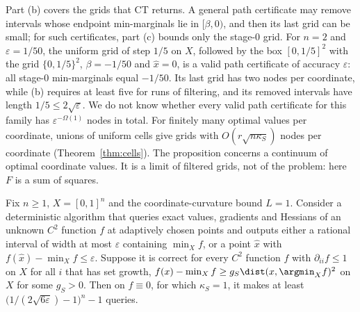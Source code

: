 Part (b) covers the grids that CT returns. A general path certificate may
remove intervals whose endpoint min-marginals lie in $[\beta,0)$, and then
its last grid can be small; for such certificates, part (c) bounds only the
stage-$0$ grid. For
$n=2$ and $\varepsilon=1/50$, the uniform grid of step $1/5$ on $X$, followed by
the box $[0,1/5]^2$ with the grid $\{0,1/5\}^2$, $\beta=-1/50$ and $\hat x=0$,
is a valid path certificate of accuracy $\varepsilon$: all stage-$0$
min-marginals equal $-1/50$. Its last grid has two nodes per coordinate,
while (b) requires at least five for runs of filtering, and its removed
intervals have length $1/5\le2\sqrt\varepsilon$. We do not know whether every
valid path certificate for this family has $\varepsilon^{-\Omega(1)}$ nodes in
total. For finitely many optimal values per coordinate, unions of uniform
cells give grids with $O(r\sqrt{n\kappa_S})$ nodes per coordinate
(Theorem~\ref{thm:cells}). The proposition concerns a
continuum of optimal coordinate values. It is a limit of filtered grids, not
of the problem: here $F$ is a sum of squares.

\begin{proposition}\label{prop:oraclebarrier}
Fix $n\ge1$, $X=[0,1]^n$ and the coordinate-curvature bound $L=1$. Consider a
deterministic algorithm that queries exact values, gradients and Hessians of
an unknown $C^2$ function $f$ at adaptively chosen points and outputs either a
rational interval of width at most $\varepsilon$ containing $\min_Xf$, or a
point $\hat x$ with $f(\hat x)-\min_Xf\le\varepsilon$. Suppose it is correct
for every $C^2$ function $f$ with $\partial_{ii}f\le1$ on $X$ for all $i$ that
has set growth, $f(x)-\min_Xf\ge g_S\dist(x,\argmin_Xf)^2$ on $X$ for some
$g_S>0$. Then on $f\equiv0$, for which $\kappa_S=1$, it makes at least
$\bigl(1/(2\sqrt{6\varepsilon})-1\bigr)^n-1$ queries.
\end{proposition}

